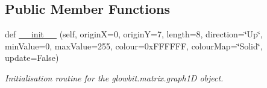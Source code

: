 \subsection*{Public Member Functions}
\begin{DoxyCompactItemize}
\item 
def \hyperlink{classglowbit_1_1glowbitMatrix_1_1graph1D_aafb789a57fe97ce1625bfb486400b2a1}{\+\_\+\+\_\+init\+\_\+\+\_\+} (self, originX=0, originY=7, length=8, direction=\char`\"{}Up\char`\"{}, min\+Value=0, max\+Value=255, colour=0x\+F\+F\+F\+F\+F\+F, colour\+Map=\char`\"{}\+Solid\char`\"{}, update=\+False)
\begin{DoxyCompactList}\small\item\em Initialisation routine for the glowbit.\+matrix.\+graph1D object. \end{DoxyCompactList}\end{DoxyCompactItemize}
